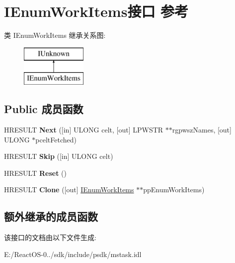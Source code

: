 \hypertarget{interface_i_enum_work_items}{}\section{I\+Enum\+Work\+Items接口 参考}
\label{interface_i_enum_work_items}
类 I\+Enum\+Work\+Items 继承关系图\+:\begin{figure}[H]
\begin{center}
\leavevmode
\includegraphics[height=2.000000cm]{interface_i_enum_work_items}
\end{center}
\end{figure}
\subsection*{Public 成员函数}
\begin{DoxyCompactItemize}
\item 
\mbox{\label{interface_i_enum_work_items_a69ab8a378bcc5c155b9979bbacd091bf}} 
H\+R\+E\+S\+U\+LT {\bfseries Next} (\mbox{[}in\mbox{]} U\+L\+O\+NG celt, \mbox{[}out\mbox{]} L\+P\+W\+S\+TR $\ast$$\ast$rgpwsz\+Names, \mbox{[}out\mbox{]} U\+L\+O\+NG $\ast$pcelt\+Fetched)
\item 
\mbox{\label{interface_i_enum_work_items_a94b017e3b8b248c16def0eb751074429}} 
H\+R\+E\+S\+U\+LT {\bfseries Skip} (\mbox{[}in\mbox{]} U\+L\+O\+NG celt)
\item 
\mbox{\label{interface_i_enum_work_items_a02b653e64604ef6399b2338a63cd098d}} 
H\+R\+E\+S\+U\+LT {\bfseries Reset} ()
\item 
\mbox{\label{interface_i_enum_work_items_a7bc06fa96e1af175ca04368eaf7faada}} 
H\+R\+E\+S\+U\+LT {\bfseries Clone} (\mbox{[}out\mbox{]} \hyperlink{interface_i_enum_work_items}{I\+Enum\+Work\+Items} $\ast$$\ast$pp\+Enum\+Work\+Items)
\end{DoxyCompactItemize}
\subsection*{额外继承的成员函数}


该接口的文档由以下文件生成\+:\begin{DoxyCompactItemize}
\item 
E\+:/\+React\+O\+S-\/0../sdk/include/psdk/mstask.\+idl\end{DoxyCompactItemize}
